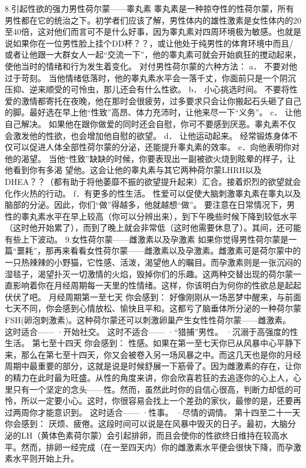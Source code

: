 \documentclass[12pt,UTF8]{ctexbook}
\begin{document}
8.引起性欲的强力男性荷尔蒙——睾丸素
睾丸素是一种掠夺性的性荷尔蒙，所有男性都在它的统治之下。初学者们应该了解，男性体内的雄性激素是女性体内的20至40倍，这对他们而言可不是什么好事，因为睾丸素对四周环境极为敏感。也就是说如果你在一位男性脸上挂个DD杯？？，或让他处于纯男性的体育环境中而且/或者让他跟一大群女人一起“交流一下”，他的睾丸素可就会开始疯狂的搅动起来，使他当时的情绪和行为发生着变化。
对付男性荷尔蒙的六种方法：
a． 不要对他过于苛刻。
当他情绪低落时，他的睾丸素水平会一落千丈，你面前只是一个阴沉压抑、逆来顺受的可怜虫，那儿还会有什么性欲。
b． 小心挑选时间。
不要将性爱的激情都寄托在夜晚，他在那时会很疲劳，过多要求只会让你搬起石头砸了自己的脚。最好选在早上他“性致”高昂、体力充沛时，让他来尽一下“义务”。
c． 让他自己解决。
如果他在跟你做爱的同时还会自慰，你可不要感到厌恶。睾丸素不仅会激发他的性欲，也会增加他自慰的欲望。
d． 让他运动起来。
经常锻炼身体不仅可以促进人体全部性荷尔蒙的分泌，还能提升睾丸素的效率。
e．向他表明你对他的渴望。
当他“性致”缺缺的时候，你要表现出一副被欲火烧到眩晕的样子，让他看到你有多渴 望他。这会让他的睾丸素与其它两种荷尔蒙LHRH以及DHEA？？（都有助于将他萎靡不振的欲望提升起来）汇合。接着炽烈的欲望就会化作火热的行动。
f．有更多的性生活。
性爱可以促使大脑刺激睾丸素在睾丸以及脑部的分泌。因此，你们“做”得越多，他就越想“做”。
要注意在日常情况下，男性的睾丸素水平在早上较高（你可以分辨出来），到下午晚些时候下降到较低水平（这时他开始累了），而到了晚上就会非常低（这时他需要休息了）。其间，还可能有些上下波动。
9.女性荷尔蒙——雌激素以及孕激素
如果你觉得男性荷尔蒙是一篇“噩耗”，那再来看看女性荷尔蒙——雌激素以及孕激素。雌激素可是荷尔蒙中的一只热辣辣的小野猫，它性感、活泼，渴望他人的瞩目。而孕激素则是一张沉闷的湿毯子，渴望扑灭一切激情的火焰，毁掉你们的乐趣。这两种交替出现的荷尔蒙一直影响着你在月经周期每一天里的性情绪。这样，你该明白为何你的性欲总是起起伏伏了吧。
月经周期第一至七天
你会感到：
好像刚刚从一场恶梦中醒来，与前面七天不同，你会感到心情放松、愉快且平和。这都亏了脑垂体所分泌的一种荷尔蒙FSH(卵泡刺激素)。这种荷尔蒙还可以刺激卵巢产生女性性荷尔蒙——雌激素。
这时适合——
·开始社交。
这时不适合——
·“猎捕”男性。
·沉溺于高强度的性生活。
第七至十四天
你会感到：
性感。如果在第一至七天你已从风暴中心平静下来，那么在第七至十四天，你又会被卷入另一场风暴之中。而这几天也是你的月经周期中最重要的部分，这就是说是时候舒展一下筋骨了。因为雌激素的存在，让你的精力在此时最为旺盛。从性的角度来讲，你会欣喜若狂的去追逐你的心上人，心里只有一个坚定的念头——性。然而，虽然此时你的自信心很高，判断力却低的可怜，所以一定要小心。这时，你很容易会找上一个差劲的家伙，最惨的是，还要再过两周你才能意识到。
这时适合——
·性事。
·尽情的调情。
第十四至二十一天
你会感到：
厌烦、疲倦。这段时间可以说是在风暴中毁灭的日子。最初，大脑分泌的LH（黄体色素荷尔蒙）会引起排卵，而且会使你的性欲终日维持在较高水平。然而，排卵一经完成（在一至四天内）你的雌激素水平便会很快下降，而孕激素水平则开始上升。
\end{document}
